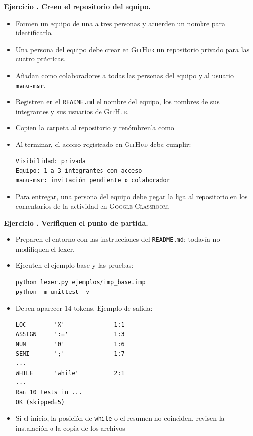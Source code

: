 \documentclass[11pt,spanish]{article}
\newcounter{ejercicio}
\newcommand{\ejercicio}[1]{%
  \stepcounter{ejercicio}%
  \textbf{Ejercicio \theejercicio. #1}%
}
\begin{document}
\ifdefined\incluirepositorio
\ejercicio{Creen el repositorio del equipo.}
\begin{itemize}
  \item Formen un equipo de una a tres personas y acuerden un nombre para identificarlo.
  \item Una persona del equipo debe crear en \textsc{GitHub} un repositorio privado para las cuatro prácticas.
  \item Añadan como colaboradores a todas las personas del equipo y al usuario \texttt{manu-msr}.
  \item Registren en el \texttt{README.md} el nombre del equipo, los nombres de sus integrantes y sus usuarios de \textsc{GitHub}.
  \item Copien la carpeta  al repositorio y renómbrenla como .
  \item Al terminar, el acceso registrado en \textsc{GitHub} debe cumplir:
\begin{lstlisting}[language={}]
Visibilidad: privada
Equipo: 1 a 3 integrantes con acceso
manu-msr: invitación pendiente o colaborador
\end{lstlisting}
  \item Para entregar, una persona del equipo debe pegar la liga al repositorio en los comentarios de la actividad en \textsc{Google Classroom}.
\end{itemize}
\fi
{}
\ejercicio{Verifiquen el punto de partida.}
\begin{itemize}
  \item Preparen el entorno con las instrucciones del \texttt{README.md}; todavía no modifiquen el lexer.
  \item Ejecuten el ejemplo base y las pruebas:
\begin{lstlisting}[language={}]
python lexer.py ejemplos/imp_base.imp
python -m unittest -v
\end{lstlisting}
  \item Deben aparecer 14 tokens. Ejemplo de salida:
\begin{lstlisting}[language={}]
LOC        'X'              1:1
ASSIGN     ':='             1:3
NUM        '0'              1:6
SEMI       ';'              1:7
...
WHILE      'while'          2:1
...
Ran 10 tests in ...
OK (skipped=5)
\end{lstlisting}
  \item Si el inicio, la posición de \texttt{while} o el resumen no coinciden, revisen la instalación o la copia de los archivos.
\end{itemize}
\end{document}
